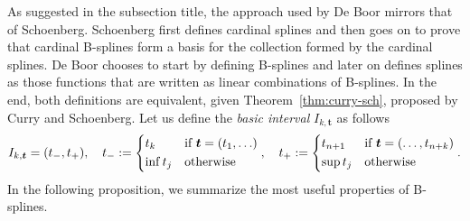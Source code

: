 As suggested in the subsection title, the approach used by De Boor mirrors that of Schoenberg.  Schoenberg first defines 
cardinal splines and then goes on to prove that cardinal B-splines form a basis for the collection formed by the 
cardinal splines. De Boor chooses to start by defining B-splines and later on defines splines as those functions that 
are written as linear combinations of B-splines. In the end, both definitions are equivalent, given 
Theorem~\ref{thm:curry-sch}, proposed by Curry and Schoenberg. Let us define the \textit{basic interval} $I_{k, \bm{t}}$  
as follows
\begin{equation*}
  I_{k, \bm{t}} = (t_-, t_+), \quad t_- := 
  \begin{dcases} t_k & \text{if} \ \bm{t} = (t_1, \ldots) \\ \inf t_j & \text{otherwise} \end{dcases}, 
  \quad t_+ := \begin{dcases} t_{n+1} & \text{if} \ \bm{t} = (\ldots, t_{n+k}) \\ \sup t_j & \text{otherwise} 
  \end{dcases}.
\end{equation*}
In the following proposition, we summarize the most useful properties of B-splines.
